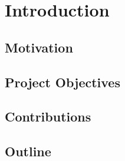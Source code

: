 \chapter{Introduction}

\section{Motivation}

\section{Project Objectives}\label{S:projectObjectives}

\section{Contributions}

\section{Outline}